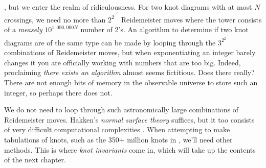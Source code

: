     \cite{CowardLackenbyReidemeisterUpperBound}, but we enter the realm of
    ridiculousness. For two knot diagrams with at most $N$ crossings, we need
    no more than $2^{2^{\cdot^{\cdot^{\cdot^{{2^{N}}}}}}}$ Reidemeister moves
    where the tower consists of a \textit{measely}
    $10^{1,000,000N}$ number of 2's. An algorithm to determine if two knot
    diagrams are of the same type can be made by looping through the
    $3^{2^{2^{\cdot^{\cdot^{\cdot^{{2^{N}}}}}}}}$ combinations of Reidemeister
    moves, but when exponentiating an integer barely changes it
    you are officially working with numbers that are too big. Indeed,
    proclaiming \textit{there exists an algorithm} almost seems fictitious.
    Does there really? There are not enough bits of memory in the observable
    universe to store such an integer, so perhaps there does not.
    \par\hfill\par
    We do not need to loop through such astronomically large combinations of
    Reidemeister moves. Hakken's \textit{normal surface theory} suffices,
    but it too consists of very difficult computational complexities
    \cite{HASS1998569}. When attempting to make tabulations of knots,
    such as the 350+ million knots in \cite{Burton2020TheN3}, we'll need
    other methods. This is where \textit{knot invariants} come in, which will
    take up the contents of the next chapter.
